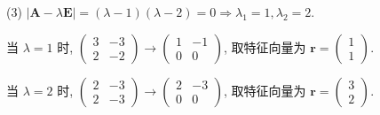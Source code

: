 \begin{solve}
  (3) $|\bm{A}-\lambda\bm{E}|=(\lambda-1)(\lambda-2)=0\Rightarrow\lambda_1=1,\lambda_2=2$.

  当 $\lambda=1$ 时, $\begin{pmatrix}3&-3\\2&-2\end{pmatrix}\to\begin{pmatrix}1&-1\\0&0\end{pmatrix}$, 
  取特征向量为 $\bm{r}=\begin{pmatrix}1\\1\end{pmatrix}$.

  当 $\lambda=2$ 时, $\begin{pmatrix}2&-3\\2&-3\end{pmatrix}\to\begin{pmatrix}2&-3\\0&0\end{pmatrix}$, 
  取特征向量为 $\bm{r}=\begin{pmatrix}3\\2\end{pmatrix}$.


\end{solve}
